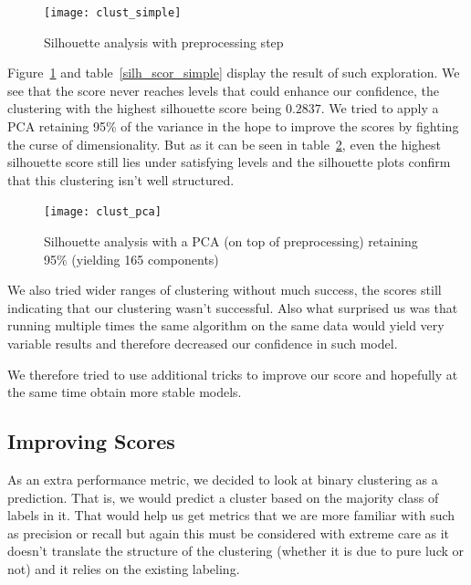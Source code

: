 \begin{figure}[ht]
    \begin{center}
    \texttt{[image: clust\_simple]}
    \end{center}
    \caption{Silhouette analysis with preprocessing step}
    \label{clust_simple}
\end{figure}

Figure~\ref{clust_simple} and table~\ref{silh_scor_simple} display the result of such exploration. We see that the score never reaches levels that could enhance our confidence, the clustering with the highest silhouette score being $0.2837$. We tried to apply a PCA retaining 95\% of the variance in the hope to improve the scores by fighting the curse of dimensionality. But as it can be seen in table~\ref{clust_pca}, even the highest silhouette score still lies under satisfying levels and the silhouette plots confirm that this clustering isn't well structured.   

\begin{figure}[ht]
    \begin{center}
    \texttt{[image: clust\_pca]}
    \end{center}
    \caption{Silhouette analysis with a PCA (on top of preprocessing) retaining 95\% (yielding 165 components)}
    \label{clust_pca}
\end{figure}

We also tried wider ranges of clustering without much success, the scores still indicating that our clustering wasn't successful. Also what surprised us was that running multiple times the same algorithm on the same data would yield very variable results and therefore decreased our confidence in such model. 

We therefore tried to use additional tricks to improve our score and hopefully at the same time obtain more stable models. 

\subsection{Improving Scores}
As an extra performance metric, we decided to look at binary clustering as a prediction. That is, we would predict a cluster based on the majority class of labels in it. That would help us get metrics that we are more familiar with such as precision or recall but again this must be considered with extreme care as it doesn't translate the structure of the clustering (whether it is due to pure luck or not) and it relies on the existing labeling.

